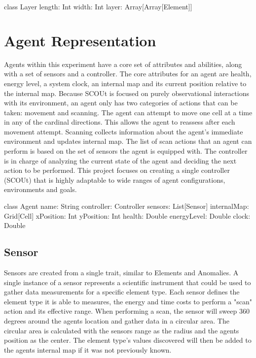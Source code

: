 class Layer {
	length: Int
	width: Int
	layer: Array[Array[Element]]
}



\section{Agent Representation}
Agents within this experiment have a core set of attributes and abilities, along with a set of sensors and a controller.
The core attributes for an agent are health, energy level, a system clock, an internal map and its current position relative to the internal map.
Because SCOUt is focused on purely observational interactions with its environment, an agent only has two categories of actions that can be taken: movement and scanning.
The agent can attempt to move one cell at a time in any of the cardinal directions.
This allows the agent to reassess after each movement attempt.
Scanning collects information about the agent's immediate environment and updates internal map.
The list of scan actions that an agent can perform is based on the set of sensors the agent is equipped with.
The controller is in charge of analyzing the current state of the agent and deciding the next action to be performed.
This project focuses on creating a single controller (SCOUt) that is highly adaptable to wide ranges of agent configurations, environments and goals.

class Agent {
  name: String
  controller: Controller
  sensors: List[Sensor]
  internalMap: Grid[Cell]
  xPosition: Int
  yPosition: Int
  health: Double
  energyLevel: Double
  clock: Double
}


\subsection{Sensor}
Sensors are created from a single trait, similar to Elements and Anomalies.
A single instance of a sensor represents a scientific instrument that could be used to gather data measurements for a specific element type.
Each sensor defines the element type it is able to measures, the energy and time costs to perform a "scan" action and its effective range.
When performing a scan, the sensor will sweep 360 degrees around the agents location and gather data in a circular area.
The circular area is calculated with the sensors range as the radius and the agents position as the center.
The element type's values discovered will then be added to the agents internal map if it was not previously known.

